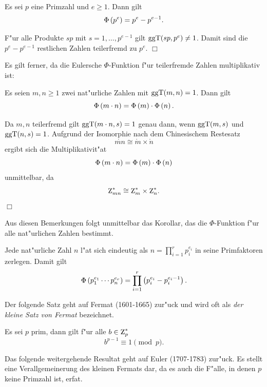 \begin{bem}[Primzahlpotenz $p^e$]
  Es sei $p$ eine Primzahl und $e \ge 1$. Dann gilt
  $$ \Phi\left( p^e \right) = p^e - p^{e-1}. $$
\end{bem} 
\beweis
F"ur alle Produkte $s p$ mit $s = 1, \ldots ,p^{e-1}$ gilt $\mbox{ggT}(s p,
p^e) \ne 1$. Damit sind die $p^e - p^{e-1}$ restlichen Zahlen teilerfremd
zu $p^e$. \hfill $\Box$

Es gilt ferner, da\3 die Eulersche $\Phi$-Funktion f"ur teilerfremde
Zahlen multiplikativ ist:

\begin{bem}
  Es seien $m, n \ge 1$ zwei nat"urliche Zahlen mit $\mbox{ggT}(m,n)=1$. 
  Dann gilt
  $$ \Phi\left( m \cdot n \right) = \Phi\left( m \right) \cdot \Phi\left( n \right) .$$
\end{bem}

\beweis
Da $m, n$ teilerfremd gilt $\mbox{ggT}(m \cdot n ,s)=1$ genau dann, wenn
$\mbox{ggT} (m,s)$ und $\mbox{ggT}(n,s)=1$. Aufgrund der Isomorphie nach dem
Chinesischem Restesatz
$$ \ring{mn} \cong \ring{m} \times \ring{n} $$
ergibt sich die Multiplikativit"at
$$ \Phi\left( m \cdot n \right) = \Phi\left( m \right) \cdot \Phi\left( n \right)$$
unmittelbar, da
$$ \einheit{mn} \cong \einheit{m} \times \einheit{n}. $$
\hfill $\Box$

Aus diesen Bemerkungen folgt unmittelbar das Korollar, das die
$\Phi$-Funktion f"ur alle nat"urlichen Zahlen bestimmt.

\begin{kor}
  Jede nat"urliche Zahl $n$ l"a\3t sich eindeutig als $n =
  \prod_{i=1}^{r} p_i^{e_i}$ in seine Primfaktoren zerlegen. Damit
  gilt
  $$ \Phi\left( p_1^{e_1} \cdots p_n^{e_r} \right) = \prod_{i=1}^r \left(
  p_i^{e_i} - p_i^{e_i-1} \right). $$
\end{kor}

Der folgende Satz geht auf Fermat (1601-1665) zur"uck und wird oft 
als {\em der kleine Satz von Fermat} bezeichnet.

\begin{satz} \label{fermat}
  Es sei $p$ prim, dann gilt f"ur alle $b\in\einheit{p}$
  $$ b^{p-1} \equiv 1 \pmod{p} .$$
\end{satz}

Das folgende weitergehende Resultat geht auf Euler (1707-1783)
zur"uck. Es stellt eine Verallgemeinerung des kleinen Fermats dar, da
es auch die F"alle, in denen $p$ keine Primzahl ist, erfa\3t.

